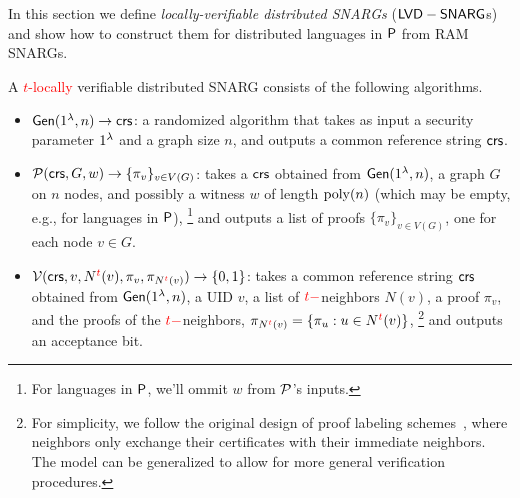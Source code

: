 In this section we define \emph{locally-verifiable distributed SNARGs} ($\mathsf{LVD}-\mathsf{SNARG}$s) and show how to construct them for distributed languages in
${\mathsf{P}}$ from RAM SNARGs.

A \textcolor{red}{$t$-locally} verifiable distributed SNARG consists of the following algorithms.

\begin{itemize}
    \item $\mathsf{Gen}(1^\lambda, n)\to \mathit{ \mathsf{crs} }$: a randomized algorithm that takes as input a security parameter $1^\lambda$ and a graph size $n$, and outputs a common reference string $\mathit{ \mathsf{crs} }$.
    \item $\mathcal{P}(\mathit{ \mathsf{crs} }, G, w)\to \{\pi_v\}_{v\in V(G)}$: takes a $\mathit{ \mathsf{crs} }$ obtained from $\mathsf{Gen}(1^{\lambda}, n)$, a graph $G$ on $n$ nodes, and possibly a witness $w$ of length $\operatorname{poly}(n)$ (which may be empty, e.g., for languages in ${\mathsf{P}}$), 
    \footnote{For languages in ${\mathsf{P}}$, we'll ommit $w$ from $\mathcal{P}$'s inputs.} 
    and outputs a list of proofs $\{\pi_v\}_{v\in V(G)}$, one for each node $v \in G$.
    \item $\mathcal{V}(\mathit{ \mathsf{crs} }, v, N^{\mathbin{\color{red}t}}(v), \pi_v, \pi_{N^{\mathbin{\color{red}t}}(v)} )\to \{0,1\}$: takes a common reference string $\mathsf{crs}$ obtained from $\mathsf{Gen}(1^{\lambda}, n)$, a UID $v$, a list of ${\mathbin{\color{red}t-}}$neighbors $N(v)$, a proof $\pi_v$, and the proofs of the ${\mathbin{\color{red}t-}}$neighbors, $\pi_{N^{\mathbin{\color{red}t}}(v)} = \left \{{ \pi_u : u \in N^{\mathbin{\color{red}t}}(v) } \right \}$, 
    \footnote{For simplicity, we follow the original design of proof labeling schemes~\cite{korman2005proof}, where neighbors only exchange their certificates with their immediate neighbors. The model can be generalized to allow for more general verification procedures.} 
    and outputs an acceptance bit. 
\end{itemize}








